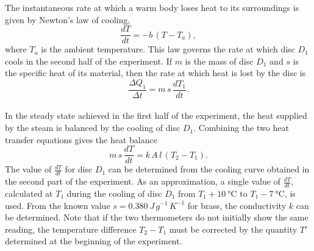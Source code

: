 \documentclass[%
 reprint,
 sor,
 jor,
 amsmath,amssymb,
 aps,
]{revtex4-2}
\begin{document}
The instantaneous rate at which a warm body loses heat to its surroundings is given by Newton’s law of cooling,
\[
\frac{dT}{dt} = -b\,(T-T_a),
\]
where $T_a$ is the ambient temperature. This law governs the rate at which disc ${D_1}$ cools in the second half of the experiment.
If $m$ is the mass of disc ${D_1}$ and $s$ is the specific heat of its material, then the rate at which heat is lost by the disc is 
\[
\frac{\Delta Q_1}{\Delta t} = m\,s\,\frac{dT_1}{dt}.
\]\\

In the steady state achieved in the first half of the experiment, the heat supplied by the steam is balanced by the cooling of disc ${D_1}$. Combining the two heat transfer equations gives the heat balance
\begin{equation}
m\,s\,\frac{dT}{dt} = k\,A\,l\,\left({T_2}-{T_1}\right).
\end{equation}
The value of $\frac{dT}{dt}$ for disc ${D_1}$ can be determined from the cooling curve obtained in the second part of the experiment. As an approximation, a single value of $\frac{dT}{dt}$, calculated at ${T_1}$ during the cooling of disc ${D_1}$ from ${T_1} + \SI{10}{\celsius}$ to ${T_1} - \SI{7}{\celsius}$, is used.
From the known value $s=\SI{0.380}{J\,g^{-1}\,K^{-1}}$ for brass, the conductivity $k$ can be determined.
Note that if the two thermometers do not initially show the same reading, the temperature difference ${T_2}-{T_1}$ must be corrected by the quantity ${T'}$ determined at the beginning of the experiment.
\end{document}
